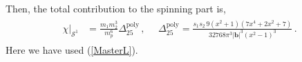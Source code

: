 Then, the total contribution to the spinning part is,
\begin{align}
    \begin{split} \label{eqt18} 
 \chi\Big|_{\mathcal{S}^1}&=\frac{m_1m_2^3}{m_p^6}\Delta_{\mathfrak{25}}^{\textrm{poly}}\,,\quad\,\,\Delta_{\mathfrak{25}}^{\textrm{poly}}=\frac{ s_{1} s_{2}\,9 \left(x^2+1\right) \left(7 x^4+2 x^2+7\right)}{32768 \pi ^3 |\boldsymbol{b}|^3 \left(x^2-1\right)^3}\,.
      \end{split}
\end{align}
Here we have used (\ref{MasterL}).

